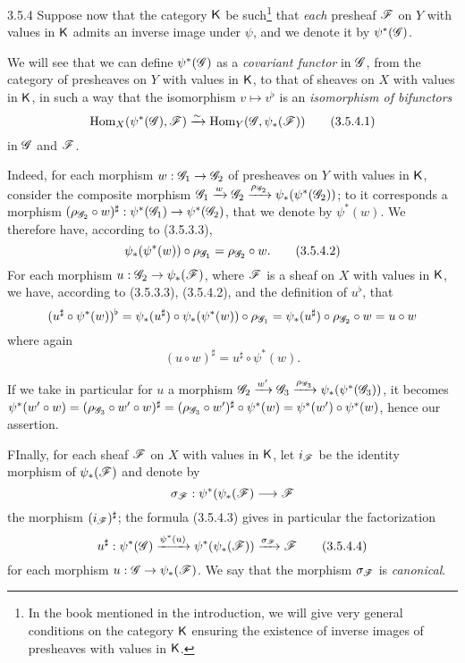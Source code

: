 \begin{env}{3.5.4}
\label{env-0.3.5.4}
Suppose now that the category $\mathsf{K}$ be such\footnote{In the book mentioned in the
introduction, we will give very general conditions on the category $\mathsf{K}$ ensuring
the existence of inverse images of presheaves with values in $\mathsf{K}$.} that
\emph{each} presheaf $\mathscr{F}$ on $Y$ with values in $\mathsf{K}$ admits an inverse image
under $\psi$, and we denote it by $\psi^*(\mathscr{G})$.

We will see that we can define $\psi^*(\mathscr{G})$ as a \emph{covariant functor} in
$\mathscr{G}$, from the category of presheaves on $Y$ with values in $\mathsf{K}$, to that of
sheaves on $X$ with values in $\mathsf{K}$, in such a way that the isomorphism
$v\mapsto v^\flat$ is an \emph{isomorphism of bifunctors}
\[
  {\mathop{\mathrm{Hom}}\nolimits}_X(\psi^*(\mathscr{G}),\mathscr{F})\xrightarrow{\sim}{\mathop{\mathrm{Hom}}\nolimits}_Y(\mathscr{G},\psi_*(\mathscr{F}))
  \tag{3.5.4.1}
\]
in $\mathscr{G}$ and $\mathscr{F}$.

Indeed, for each morphism $w:\mathscr{G}_1\to\mathscr{G}_2$ of presheaves on $Y$ with
values in $\mathsf{K}$, consider the composite morphism
$\mathscr{G}_1\xrightarrow{w}\mathscr{G}_2
  \xrightarrow{\rho_{\mathscr{G}_2}}\psi_*(\psi^*(\mathscr{G}_2))$; to it corresponds a
morphism $(\rho_{\mathscr{G}_2}\circ w)^\sharp:\psi^*(\mathscr{G}_1)\to\psi^*(\mathscr{G}_2)$,
that we denote by $\psi^*(w)$. We therefore have, according to (3.5.3.3),
\[
  \psi_*(\psi^*(w))\circ\rho_{\mathscr{G}_1}=\rho_{\mathscr{G}_2}\circ w.
  \tag{3.5.4.2}
\]
For each morphism $u:\mathscr{G}_2\to\psi_*(\mathscr{F})$, where $\mathscr{F}$ is a sheaf on
$X$ with values in $\mathsf{K}$, we have, according to (3.5.3.3), (3.5.4.2), and the
definition of $u^\flat$, that
\[
  (u^\sharp\circ\psi^*(w))^\flat
  =\psi_*(u^\sharp)\circ\psi_*(\psi^*(w))\circ\rho_{\mathscr{G}_1}
  =\psi_*(u^\sharp)\circ\rho_{\mathscr{G}_2}\circ w=u\circ w
\]
where again
\[
  (u\circ w)^\sharp=u^\sharp\circ\psi^*(w).
  \tag{3.5.4.3}
\]

If we take in particular for $u$ a morphism
$\mathscr{G}_2\xrightarrow{w'}\mathscr{G}_3
  \xrightarrow{\rho_{\mathscr{G}_3}}\psi_*(\psi^*(\mathscr{G}_3))$, it becomes
$\psi^*(w'\circ w)=(\rho_{\mathscr{G}_3}\circ w'\circ w)^\sharp
  =(\rho_{\mathscr{G}_3}\circ w')^\sharp\circ\psi^*(w)=\psi^*(w')\circ\psi^*(w)$,
hence our assertion.

FInally, for each sheaf $\mathscr{F}$ on $X$ with values in $\mathsf{K}$, let $i_\mathscr{F}$ be
the identity morphism of $\psi_*(\mathscr{F})$ and denote by
\[
  \sigma_\mathscr{F}:\psi^*(\psi_*(\mathscr{F})\longrightarrow\mathscr{F}
\]
the morphism $(i_\mathscr{F})^\sharp$; the formula (3.5.4.3) gives in particular the
factorization
\[
  u^\sharp:\psi^*(\mathscr{G})\xrightarrow{\psi^*(u)}\psi^*(\psi_*(\mathscr{F}))
  \xrightarrow{\sigma_\mathscr{F}}\mathscr{F}
  \tag{3.5.4.4}
\]
for each morphism $u:\mathscr{G}\to\psi_*(\mathscr{F})$. We say that the morphism
$\sigma_\mathscr{F}$ is \emph{canonical}.
\end{env}


